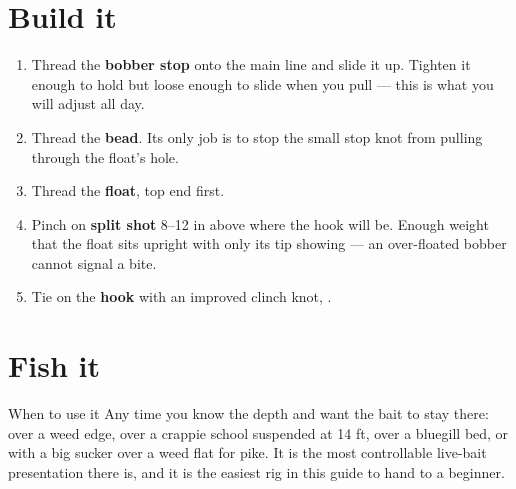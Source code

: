 \section{Build it}
\begin{enumerate}
\item Thread the \textbf{bobber stop} onto the main line and slide it up. Tighten it enough to hold but loose enough to slide when you pull --- this is what you will adjust all day.
\item Thread the \textbf{bead}. Its only job is to stop the small stop knot from pulling through the float's hole.
\item Thread the \textbf{float}, top end first.
\item Pinch on \textbf{split shot} 8--12 in above where the hook will be. Enough weight that the float sits upright with only its tip showing --- an over-floated bobber cannot signal a bite.
\item Tie on the \textbf{hook} with an improved clinch knot, .
\end{enumerate}

\section{Fish it}
\begin{telosfacts}[0.20]
\end{telosfacts}

\begin{telospanel}{When to use it}
Any time you know the depth and want the bait to stay there: over a weed edge, over a crappie school suspended at 14 ft, over a bluegill bed, or with a big sucker over a weed flat for pike. It is the most controllable live-bait presentation there is, and it is the easiest rig in this guide to hand to a beginner.
\end{telospanel}

